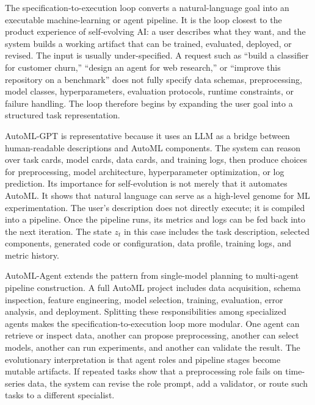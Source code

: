The specification-to-execution loop converts a natural-language goal into an executable machine-learning or agent pipeline.  It is the loop closest to the product experience of self-evolving AI: a user describes what they want, and the system builds a working artifact that can be trained, evaluated, deployed, or revised.  The input is usually under-specified.  A request such as ``build a classifier for customer churn,'' ``design an agent for web research,'' or ``improve this repository on a benchmark'' does not fully specify data schemas, preprocessing, model classes, hyperparameters, evaluation protocols, runtime constraints, or failure handling.  The loop therefore begins by expanding the user goal into a structured task representation.

AutoML-GPT is representative because it uses an LLM as a bridge between human-readable descriptions and AutoML components.  The system can reason over task cards, model cards, data cards, and training logs, then produce choices for preprocessing, model architecture, hyperparameter optimization, or log prediction.  Its importance for self-evolution is not merely that it automates AutoML.  It shows that natural language can serve as a high-level genome for ML experimentation.  The user's description does not directly execute; it is compiled into a pipeline.  Once the pipeline runs, its metrics and logs can be fed back into the next iteration.  The state $z_t$ in this case includes the task description, selected components, generated code or configuration, data profile, training logs, and metric history.

AutoML-Agent extends the pattern from single-model planning to multi-agent pipeline construction.  A full AutoML project includes data acquisition, schema inspection, feature engineering, model selection, training, evaluation, error analysis, and deployment.  Splitting these responsibilities among specialized agents makes the specification-to-execution loop more modular.  One agent can retrieve or inspect data, another can propose preprocessing, another can select models, another can run experiments, and another can validate the result.  The evolutionary interpretation is that agent roles and pipeline stages become mutable artifacts.  If repeated tasks show that a preprocessing role fails on time-series data, the system can revise the role prompt, add a validator, or route such tasks to a different specialist.

